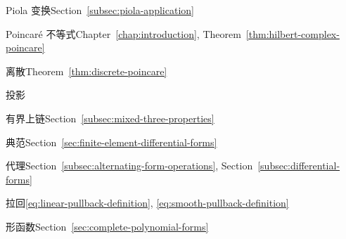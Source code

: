 \par\noindent\hspace*{0em}\label{index:piola-transform}{Piola 变换}\quad Section~\ref{subsec:piola-application}

\par\noindent\hspace*{0em}\label{index:poincar-inequality}{Poincaré 不等式}\quad Chapter~\ref{chap:introduction}, Theorem~\ref{thm:hilbert-complex-poincare}

\par\noindent\hspace*{1em}\label{index:poincar-inequality-discrete}{离散}\quad Theorem~\ref{thm:discrete-poincare}

\par\noindent\hspace*{0em}\label{index:projection}{投影}

\par\noindent\hspace*{1em}\label{index:projection-bounded-cochain}{有界上链}\quad Section~\ref{subsec:mixed-three-properties}

\par\noindent\hspace*{1em}\label{index:projection-canonical}{典范}\quad Section~\ref{sec:finite-element-differential-forms}

\par\noindent\hspace*{0em}\label{index:proxy}{代理}\quad Section~\ref{subsec:alternating-form-operations}, Section~\ref{subsec:differential-forms}

\par\noindent\hspace*{0em}\label{index:pullback}{拉回}\quad \eqref{eq:linear-pullback-definition}, \eqref{eq:smooth-pullback-definition}

\par\noindent\hspace*{0em}\label{index:shape-functions}{形函数}\quad Section~\ref{sec:complete-polynomial-forms}

